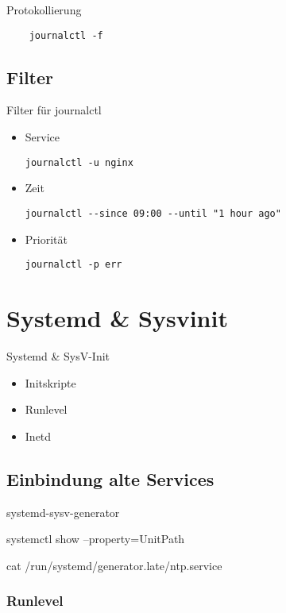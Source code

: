 \begin{frame}[fragile]{Protokollierung}
  \begin{lstlisting}
    journalctl -f
    \end{lstlisting}
\end{frame}
  
\subsection{Filter}

\begin{frame}[fragile]{Filter für journalctl}
  \begin{itemize}
  \item Service

	  \verb|journalctl -u nginx|
  \item Zeit

	  \verb|journalctl --since 09:00 --until "1 hour ago"|
  \item Priorität

	  \verb|journalctl -p err|
  \end{itemize}
\end{frame}

\section{Systemd \& Sysvinit}

\begin{frame}{Systemd \& SysV-Init}
  \begin{itemize}
  \item Initskripte
  \item Runlevel
  \item Inetd
  \end{itemize}
\end{frame}

\subsection{Einbindung alte Services}

\begin{frame}
systemd-sysv-generator

 systemctl show --property=UnitPath

 cat /run/systemd/generator.late/ntp.service
\end{frame}

 \subsubsection{Runlevel}

